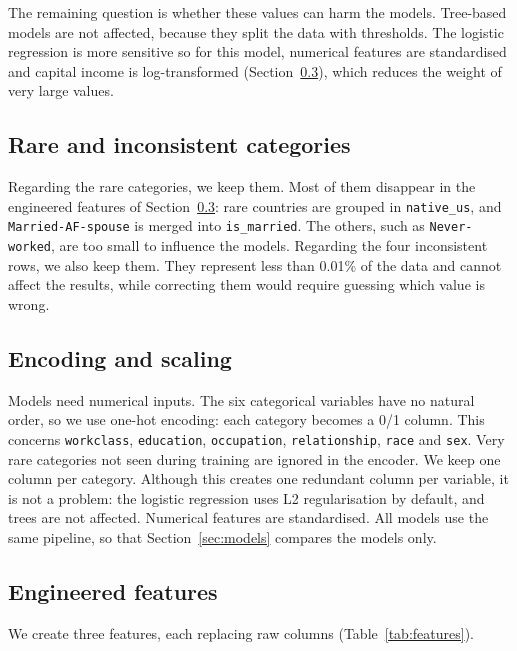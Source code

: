 \documentclass[10pt,a4paper]{article}
\begin{document}
The remaining question is whether these values can harm the models. Tree-based models are
not affected, because they split the data with thresholds. The logistic regression is more sensitive so for this model, numerical features are standardised and capital
income is log-transformed (Section~\ref{sec:features}), which reduces the weight of very
large values.

\subsection{Rare and inconsistent categories}
Regarding the rare categories, we keep them. Most of them disappear in the engineered
features of Section~\ref{sec:features}: rare countries are grouped in
\texttt{native\_us}, and \texttt{Married-AF-spouse} is merged into \texttt{is\_married}.
The others, such as \texttt{Never-worked}, are too small to influence the models.
Regarding the four inconsistent rows, we also keep them. They represent less than 0.01\%
of the data and cannot affect the results, while correcting them would
require guessing which value is wrong.

\subsection{Encoding and scaling}
Models need numerical inputs. The six categorical variables have no natural order, so we
use one-hot encoding: each category becomes a 0/1 column. This concerns
\texttt{workclass}, \texttt{education}, \texttt{occupation}, \texttt{relationship},
\texttt{race} and \texttt{sex}. Very rare categories not seen during training are ignored in the encoder. 
We keep one column per category. Although this
creates one redundant column per variable, it is not a problem: the logistic
regression uses L2 regularisation by default, and trees are not affected. Numerical
features are standardised. All models use the same pipeline, so that
Section~\ref{sec:models} compares the models only.

\subsection{Engineered features}
\label{sec:features}
We create three features, each replacing raw columns (Table~\ref{tab:features}).
\end{document}
